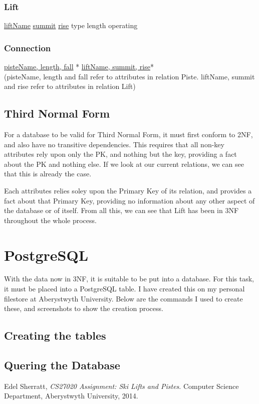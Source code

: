 \documentclass[11pt]{scrartcl} %
\begin{document}
\subsubsection{Lift}
\underline{liftName}\newline
\underline{summit}\newline
\underline{rise}\newline
type\newline
length\newline
operating

\subsubsection{Connection}
\underline{pisteName, length, fall} *\newline
\underline{liftName, summit, rise}*\\[0.2cm]
(pisteName, length and fall refer to attributes in relation Piste. liftName, summit and rise refer to attributes in relation Lift)

\subsection{Third Normal Form}
For a database to be valid for Third Normal Form, it must first conform to 2NF, and also have no transitive dependencies. This requires that all non-key attributes rely upon only the PK, and nothing but the key, providing a fact about the PK and nothing else. If we look at our current relations, we can see that this is already the case.

Each attributes relies soley upon the Primary Key of its relation, and provides a fact about that Primary Key, providing no information about any other aspect of the database or of itself. From all this, we can see that Lift has been in 3NF throughout the whole process.

\newpage

\section{PostgreSQL}
With the data now in 3NF, it is suitable to be put into a database. For this task, it must be placed into a PostgreSQL table. I have created this on my personal filestore at Aberystwyth University. Below are the commands I used to create these, and screenshots to show the creation process.

\subsection{Creating the tables}

\subsection{Quering the Database}

\newpage

\begin{thebibliography}{9}

  Edel Sherratt,
  \emph{CS27020 Assignment: Ski Lifts and Pistes}.
  Computer Science Department,
  Aberystwyth University,
  2014.

\end{thebibliography}
\end{document}
